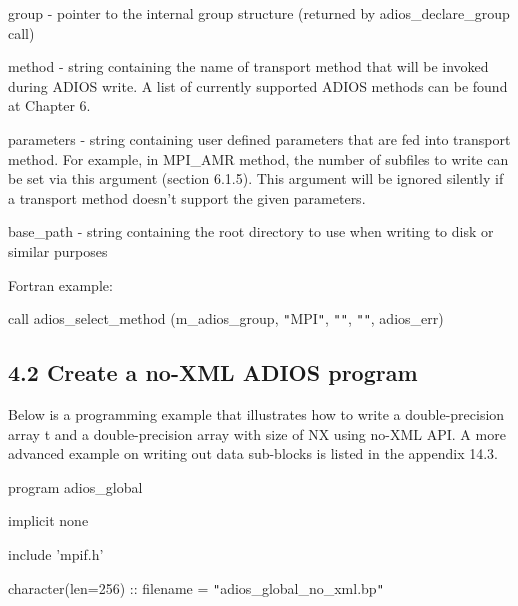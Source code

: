 \vspace{10pt}
group - pointer to the internal group structure (returned by adios\_declare\_group 
call)

\vspace{10pt}
method - string containing the name of transport method that will be invoked during 
ADIOS write. A list of currently supported ADIOS methods can be found at Chapter 
6.

\vspace{10pt}
parameters - string containing user defined parameters that are fed into transport 
method.  For example, in MPI\_AMR method, the number of subfiles to write can be 
set via this argument (section 6.1.5).  This argument will be ignored silently 
if a transport method doesn't support the given parameters.

\vspace{10pt}
base\_path -  string containing the root directory to use when writing to disk 
or similar purposes

\vspace{22pt}
\leftskip=22pt
Fortran example: 

\vspace{10pt}
call adios\_select\_method (m\_adios\_group, \texttt{"}MPI\texttt{"}, \texttt{"}\texttt{"}, 
\texttt{"}\texttt{"}, adios\_err)\label{HToc182553362}

\vspace{34pt}
\subsection*{{\large 4.2 Create a no-XML ADIOS program}}

\vspace{10pt}
\leftskip=0pt
Below is a programming example that illustrates how to write a double-precision 
array t and a double-precision array with size of NX using no-XML API.   A more 
advanced example on writing out data sub-blocks is listed in the appendix 14.3. 


\vspace{22pt}
program adios\_global

\vspace{10pt}
\parindent=14pt
implicit none

\vspace{10pt}
include 'mpif.h'

\vspace{10pt}
\parindent=28pt
character(len=256)      :: filename = \texttt{"}adios\_global\_no\_xml.bp\texttt{"}

